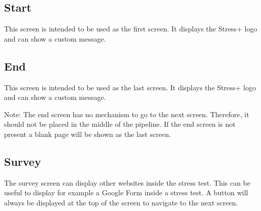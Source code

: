 \subsection{Start}
\label{sec:screens-start}
This screen is intended to be used as the first screen.
It displays the Stress+ logo and can show a custom message.

\subsection{End}
\label{sec:screens-end}
This screen is intended to be used as the last screen.
It displays the Stress+ logo and can show a custom message.

Note: The end screen has no mechanism to go to the next screen. 
Therefore, it should not be placed in the middle of the pipeline.
If the end screen is not present a blank page will be shown as the last screen.

\subsection{Survey}
\label{sec:screens-survey}
The survey screen can display other websites inside the stress test. 
This can be useful to display for example a Google Form inside a stress test.
A button will always be displayed at the top of the screen to navigate to the next screen.
